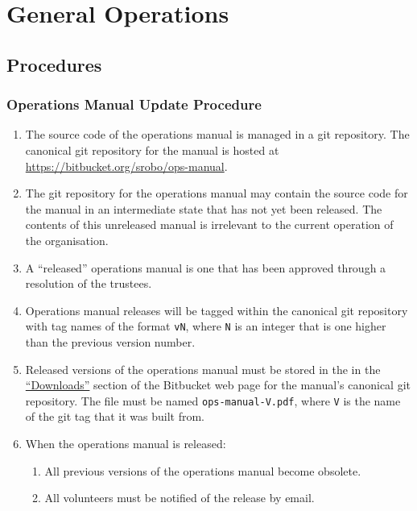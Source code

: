 \chapter{General Operations}


\section{Procedures}

\subsection{Operations Manual Update Procedure}
\label{sec:ops-man-update-procedure}

\begin{enumerate}
\item The source code of the operations manual is managed in a git repository.  The canonical git repository for the manual is hosted at \url{https://bitbucket.org/srobo/ops-manual}.

\item The git repository for the operations manual may contain the source code for the manual in an intermediate state that has not yet been released.  The contents of this unreleased manual is irrelevant to the current operation of the organisation.

\item A ``released'' operations manual is one that has been approved through a resolution of the trustees.

\item Operations manual releases will be tagged within the canonical git repository with tag names of the format \texttt{vN}, where \texttt{N} is an integer that is one higher than the previous version number.

\item Released versions of the operations manual must be stored in the in the \href{https://bitbucket.org/srobo/ops-manual/downloads}{``Downloads''} section of the Bitbucket web page for the manual's canonical git repository.  The file must be named \texttt{ops-manual-V.pdf}, where \texttt{V} is the name of the git tag that it was built from.

\item When the operations manual is released:
  \begin{enumerate}
  \item All previous versions of the operations manual become obsolete.
  \item All volunteers must be notified of the release by email.
  \end{enumerate}
\end{enumerate}

